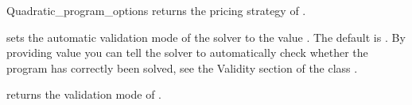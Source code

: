 \begin{ccRefClass}{Quadratic_program_options}
{returns the pricing strategy of \ccVar.}


{sets the automatic validation mode of the solver to the value .
The default is . By providing value  you can
tell the solver to automatically check whether the program has
correctly been solved, see the Validity section of the class
.}

{returns the validation mode of \ccVar.}

\ccExample
{}

\ccSeeAlso

\\
\\
\\
\\
\end{ccRefClass}

